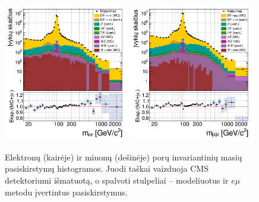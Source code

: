 \documentclass[a4paper, 12pt, oneside]{article}
\newcommand{\emu}{e\mu}
\begin{document}
\begin{figure}[H]
	\includegraphics[width=0.49\textwidth]{ee_mass_est.png}
	\includegraphics[width=0.49\textwidth]{mumu_mass_est.png}
	\caption{\label{fig:MassDataMCest}
		Elektronų (kairėje) ir miuonų (dešinėje) porų invariantinių masių pasiskirstymų histogramos.
		Juodi taškai vaizduoja CMS detektoriumi išmatuotą, o spalvoti stulpeliai -- modeliuotus ir $\emu$ metodu įvertintus
		pasiskirstymus.}
\end{figure}
\end{document}
